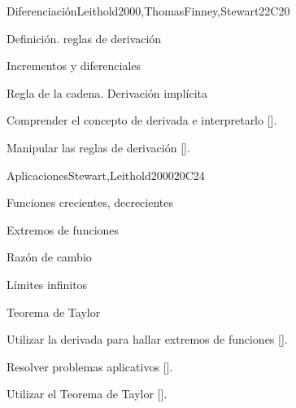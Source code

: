 \begin{syllabus}
\begin{unit}{}{Diferenciación}{Leithold2000,ThomasFinney,Stewart}{22}{C20}
   \begin{topics}
      \item Definición. reglas de derivación
      \item Incrementos y diferenciales
      \item Regla de la cadena. Derivación implícita
   \end{topics}

   \begin{learningoutcomes}
      \item Comprender el concepto de derivada e interpretarlo [\Assessment].
      \item Manipular las reglas de derivación [\Assessment].
      \end{learningoutcomes}
\end{unit}

\begin{unit}{}{Aplicaciones}{Stewart,Leithold2000}{20}{C24}
   \begin{topics}
      \item Funciones crecientes, decrecientes
      \item Extremos de funciones
      \item Razón de cambio
      \item Límites infinitos
      \item Teorema de Taylor
   \end{topics}

   \begin{learningoutcomes}
      \item Utilizar la derivada para hallar extremos de funciones [\Assessment].
      \item Resolver problemas aplicativos [\Assessment].
      \item Utilizar el Teorema de Taylor [\Assessment].
   \end{learningoutcomes}
\end{unit}



\begin{coursebibliography}
\end{coursebibliography}

\end{syllabus}

%
